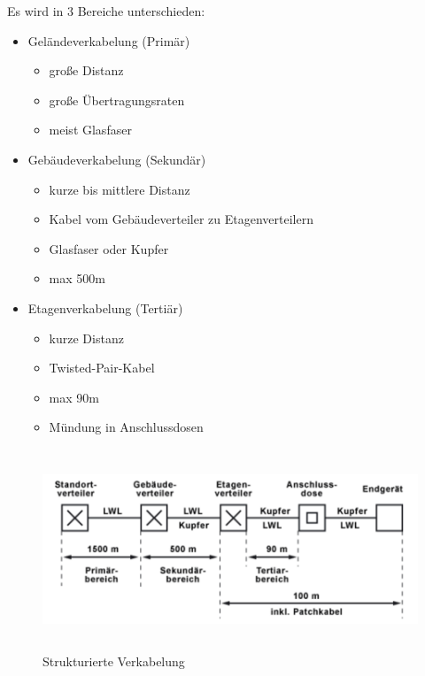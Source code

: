 \documentclass[10pt]{article}
\begin{document}
Es wird in 3 Bereiche unterschieden:
\begin{itemize}
    \item Geländeverkabelung (Prim\"ar)
        \begin{itemize}
            \item große Distanz
            \item große \"Ubertragungsraten
            \item meist Glasfaser
        \end{itemize}
    \item Gebäudeverkabelung (Sekund\"ar)
        \begin{itemize}
            \item kurze bis mittlere Distanz
            \item Kabel vom Geb\"audeverteiler zu Etagenverteilern
            \item Glasfaser oder Kupfer
            \item max 500m
        \end{itemize}
    \item Etagenverkabelung (Terti\"ar)
        \begin{itemize}
            \item kurze Distanz
            \item Twisted-Pair-Kabel
            \item max 90m
            \item M\"undung in Anschlussdosen
        \end{itemize}
\end{itemize}
\begin{figure}[H]
\begin{center}
  \includegraphics[height=6cm]{struk.png}
  \end{center}
  \caption{Strukturierte Verkabelung}
  \label{fig:Strukturierte Verkabelung}
\end{figure}
\break
\end{document}
